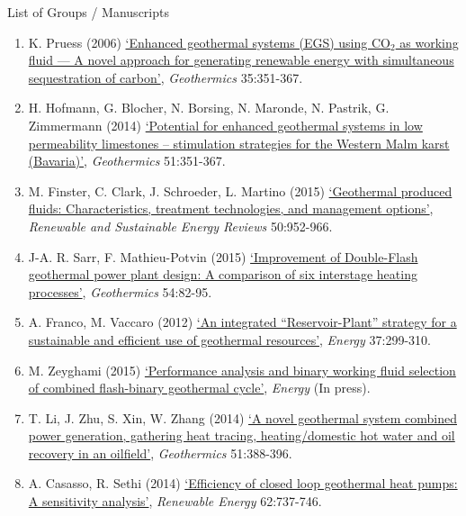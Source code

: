\documentclass[12pts,a4paper]{report}%
\begin{document}
\clearpage

\begin{center}
{\Large List of Groups / Manuscripts}
\end{center}


\begin{enumerate}[label=\bfseries Group \arabic*:]
%
\item K. Pruess (2006) \href{http://dx.doi.org/10.1016/j.geothermics.2006.08.002}{`Enhanced geothermal systems (EGS) using CO$_{2}$ as working fluid — A novel approach for generating renewable energy with simultaneous sequestration of carbon'}, {\it Geothermics} 35:351-367.
%
\item H. Hofmann, G. Blocher, N. Borsing, N. Maronde, N. Pastrik, G. Zimmermann (2014) \href{http://dx.doi.org/10.1016/j.geothermics.2014.03.003}{`Potential for enhanced geothermal systems in low permeability limestones – stimulation strategies for the Western Malm karst (Bavaria)'}, {\it Geothermics} 51:351-367.
%
\item M. Finster, C. Clark, J. Schroeder, L. Martino (2015) \href{http://dx.doi.org/10.1016/j.rser.2015.05.059}{`Geothermal produced fluids: Characteristics, treatment technologies, and management options'}, {\it Renewable and Sustainable Energy Reviews} 50:952-966.
%
\item J-A. R. Sarr, F. Mathieu-Potvin (2015) \href{http://dx.doi.org/10.1016/j.geothermics.2014.12.002}{`Improvement of Double-Flash geothermal power plant design: A comparison of six interstage heating processes'}, {\it Geothermics} 54:82-95.
%
\item A. Franco, M. Vaccaro (2012) \href{http://dx.doi.org/10.1016/j.energy.2011.11.029}{`An integrated “Reservoir-Plant” strategy for a sustainable and efficient use of geothermal resources'}, {\it Energy} 37:299-310.
%
\item M. Zeyghami (2015) \href{http://dx.doi.org/10.1016/j.energy.2015.05.092}{`Performance analysis and binary working fluid selection of combined flash-binary geothermal cycle'}, {\it Energy} (In press).
%
\item T. Li, J. Zhu, S. Xin, W. Zhang (2014) \href{http://dx.doi.org/10.1016/j.geothermics.2014.03.009}{`A novel geothermal system combined power generation, gathering heat tracing, heating/domestic hot water and oil recovery in an oilfield'}, {\it Geothermics} 51:388-396.
%
\item A. Casasso, R. Sethi (2014) \href{http://dx.doi.org/10.1016/j.renene.2013.08.019}{`Efficiency of closed loop geothermal heat pumps: A sensitivity analysis'}, {\it Renewable Energy} 62:737-746.

\end{enumerate}
\end{document}
